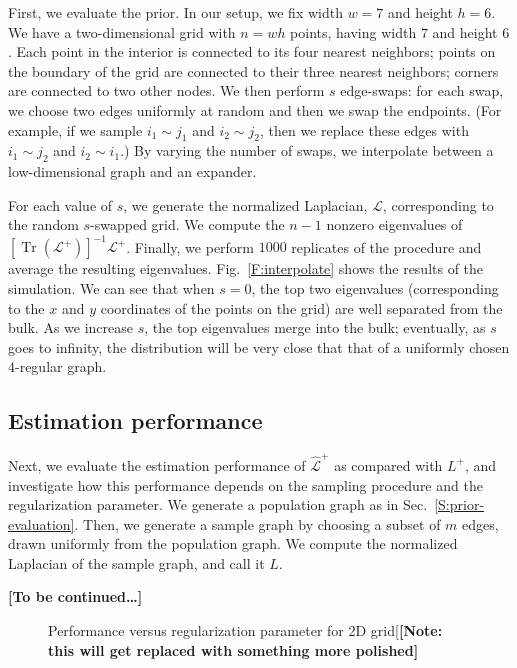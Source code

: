 \documentclass[12pt]{article}
\DeclareMathOperator*{\Tr}{Tr}
\theoremstyle{plain}
\begin{document}
First, we evaluate the prior.  In our setup, we fix width $w = 7$ and
height $h = 6$.  We have a two-dimensional grid with $n = w h$ points,
having width $7$ and height $6$.  Each point in the
interior is connected to its four nearest neighbors; points on the
boundary of the grid are connected to their three nearest neighbors;
corners are connected to two other nodes.  We then perform
$s$ edge-swaps: for each swap, we choose two edges
uniformly at random and then we swap the endpoints.  (For example, if
we sample $i_1 \sim j_1$ and $i_2 \sim j_2$, then we replace these
edges with $i_1 \sim j_2$ and $i_2 \sim i_1$.)  By varying the number
of swaps, we interpolate between a low-dimensional graph and an expander.

For each value of $s$, we generate the normalized Laplacian, $\mathcal{L}$,
corresponding to the random $s$-swapped grid.  We compute the $n-1$ nonzero
eigenvalues of $[\Tr(\mathcal{L}^{+})]^{-1} \mathcal{L}^{+}$.
Finally, we perform $1000$ replicates of the procedure and average the
resulting eigenvalues.  Fig.~\ref{F:interpolate} shows the results of
the simulation.  We can see that when $s = 0$, the top two eigenvalues
(corresponding to the $x$ and $y$ coordinates of the points on the grid)
are well separated from the bulk.  As we increase $s$, the top eigenvalues
merge into the bulk; eventually, as $s$ goes to infinity, the
distribution will be very close that that of a uniformly chosen
$4$-regular graph.


\subsection{Estimation performance}

Next, we evaluate the estimation performance of $\mathcal{\hat L}^{+}$
as compared with $L^+$, and investigate how this performance depends
on the sampling procedure and the regularization parameter.  We
generate a population graph as in Sec.~\ref{S:prior-evaluation}.
Then, we generate a sample graph by choosing a subset of $m$ edges,
drawn uniformly from the population graph.  We compute the normalized
Laplacian of the sample graph, and call it $L$.

\textbf{[To be continued\ldots]}

\begin{figure}
    \centering
    \caption{Performance versus regularization parameter for 2D
      grid[\textbf{[Note: this will get replaced with something more polished]}}
\end{figure}
\end{document}

